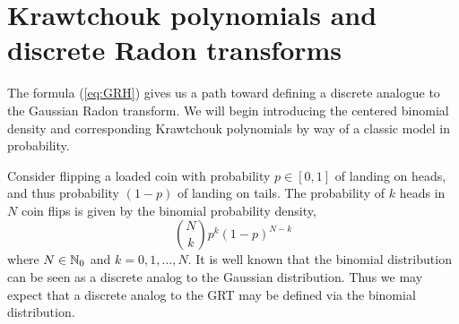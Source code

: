 


\section{Krawtchouk polynomials and discrete Radon transforms}



The formula (\ref{eq:GRH}) gives us a path toward defining a discrete analogue to the Gaussian Radon transform. We will begin introducing the centered binomial density and corresponding Krawtchouk polynomials by way of a classic model in probability.

Consider flipping a loaded coin with probability $p \in [0,1]$ of landing on heads, and thus probability $(1 - p)$ of landing on tails. The probability of $k$ heads in $N$ coin flips is given by the binomial probability density,
\[
  \binom{N}{k}p^k(1-p)^{N-k}
\]
where $N \in \mathbb{N}_0$ and $k = 0, 1, \ldots, N$. It is well known that the binomial distribution can be seen as a discrete analog to the Gaussian distribution. Thus we may expect that a discrete analog to the GRT may be defined via the binomial distribution.

